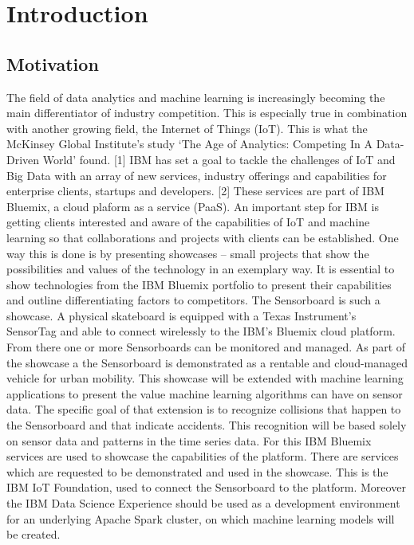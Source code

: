 \chapter{Introduction}
\label{ch:Introduction}

\section{Motivation}
\label{sec:Motivation}
The field of data analytics and machine learning is increasingly becoming the main differentiator of industry competition. This is especially true in combination with another growing field, the Internet of Things (IoT). This is what the McKinsey Global Institute’s study ‘The Age of Analytics: Competing In A Data-Driven World’ found. [1] IBM has set a goal to tackle the challenges of IoT and Big Data with an array of new services, industry offerings and capabilities for enterprise clients, startups and developers. [2] These services are part of IBM Bluemix, a cloud plaform  as a service (PaaS). 
\newline
An important step for IBM is getting clients interested and aware of the capabilities of IoT and machine learning so that collaborations and projects with clients can be established. One way this is done is by presenting showcases – small projects that show the possibilities and values of the technology in an exemplary way. It is essential to show technologies from the IBM Bluemix portfolio to present their capabilities and outline differentiating factors to competitors.
 \newline
The Sensorboard is such a showcase. A physical skateboard is equipped with a Texas Instrument’s SensorTag and able to connect wirelessly to the IBM's Bluemix cloud platform. From there one or more Sensorboards can be monitored and managed. As part of the showcase a the Sensorboard is demonstrated as a rentable and cloud-managed vehicle for urban mobility.
 \newline
This showcase will be extended with machine learning applications to present the value machine learning algorithms can have on sensor data. The specific goal of that extension is to recognize collisions that happen to the Sensorboard and that indicate accidents. This recognition will be based solely on sensor data and  patterns in the time series data. For this IBM Bluemix services are used to showcase the capabilities of the platform. There are services which are requested to be demonstrated and used in the showcase. This is the IBM IoT Foundation, used to connect the Sensorboard to the platform. Moreover the IBM Data Science Experience should be used as a development environment for an underlying Apache Spark cluster, on which machine learning models will be created.

